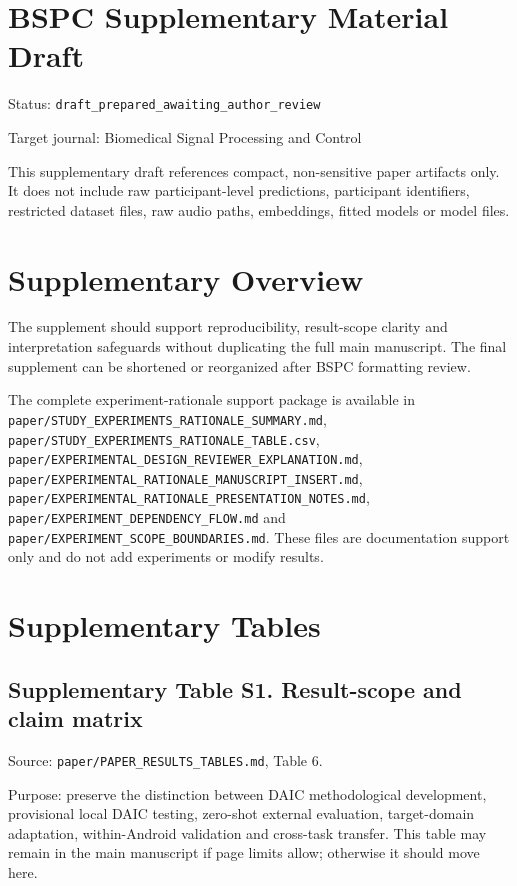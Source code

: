 \documentclass[lettersize,journal]{IEEEtran}
\begin{document}
\section*{BSPC Supplementary Material Draft}

Status: \texttt{draft\_prepared\_awaiting\_author\_review}

Target journal: Biomedical Signal Processing and Control

This supplementary draft references compact, non-sensitive paper artifacts only. It does not include raw participant-level predictions, participant identifiers, restricted dataset files, raw audio paths, embeddings, fitted models or model files.

\section{Supplementary Overview}

The supplement should support reproducibility, result-scope clarity and interpretation safeguards without duplicating the full main manuscript. The final supplement can be shortened or reorganized after BSPC formatting review.

The complete experiment-rationale support package is available in \texttt{paper/STUDY\_EXPERIMENTS\_RATIONALE\_SUMMARY.md}, \texttt{paper/STUDY\_EXPERIMENTS\_RATIONALE\_TABLE.csv}, \texttt{paper/EXPERIMENTAL\_DESIGN\_REVIEWER\_EXPLANATION.md}, \texttt{paper/EXPERIMENTAL\_RATIONALE\_MANUSCRIPT\_INSERT.md}, \texttt{paper/EXPERIMENTAL\_RATIONALE\_PRESENTATION\_NOTES.md}, \texttt{paper/EXPERIMENT\_DEPENDENCY\_FLOW.md} and \texttt{paper/EXPERIMENT\_SCOPE\_BOUNDARIES.md}. These files are documentation support only and do not add experiments or modify results.

\section{Supplementary Tables}

\subsection{Supplementary Table S1. Result-scope and claim matrix}

Source: \texttt{paper/PAPER\_RESULTS\_TABLES.md}, Table 6.

Purpose: preserve the distinction between DAIC methodological development, provisional local DAIC testing, zero-shot external evaluation, target-domain adaptation, within-Android validation and cross-task transfer. This table may remain in the main manuscript if page limits allow; otherwise it should move here.
\end{document}
